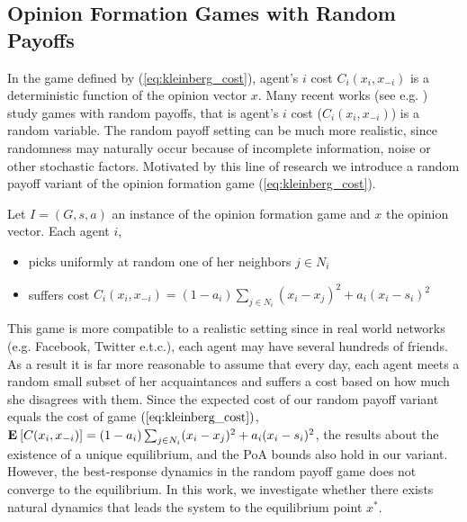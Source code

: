 \subsection{Opinion Formation Games with Random Payoffs}
In the game defined by (\ref{eq:kleinberg_cost}),
agent's $i$ cost $C_i(x_i,x_{-i})$ is a deterministic function of the
opinion vector $x$. Many recent works (see e.g. \cite{Zhou17}) study games
with random payoffs, that is agent's $i$ cost ($C_i(x_i,x_{-i})$) is a
random variable. The random payoff setting can be much more realistic,
since randomness may naturally occur because of incomplete information, noise
or other stochastic factors. Motivated by this
line of research we introduce a random payoff variant of the opinion
formation game (\ref{eq:kleinberg_cost}).

\begin{definition}\label{d:random_payoff_game}
  Let $I=(G,s,a)$ an instance of the opinion formation game
  and $x$ the opinion vector. Each agent $i$,
  \begin{itemize}
    \item picks uniformly at random one of her neighbors $j \in N_i$
    \item suffers cost
      $C_i(x_i,x_{-i}) = (1-a_i)\sum_{j \in N_i}(x_i-x_j)^2 + a_i(x_i-s_i)^2$
  \end{itemize}
\end{definition}

This game is more compatible to a realistic setting since
in real world networks (e.g. Facebook, Twitter e.t.c.), each agent may have
several hundreds of friends. As a result it is far more reasonable to assume that
every day, each agent meets a random small subset of her acquaintances and
suffers a cost based on how much she disagrees with them.
Since the expected cost of our random payoff variant equals
the cost of game $(\ref{eq:kleinberg_cost})$, $ \Exp{C(x_i, x_{-i})} =
(1-a_i)\sum_{j \in N_i}(x_i-x_j)^2 + a_i(x_i-s_i)^2$,
the results about the existence of a unique equilibrium,
and the PoA bounds also hold in our variant.
However, the best-response dynamics in the random payoff game
does not converge to the equilibrium.  In this work, we investigate
whether there exists natural dynamics that leads the system to the
equilibrium point $x^*$.

